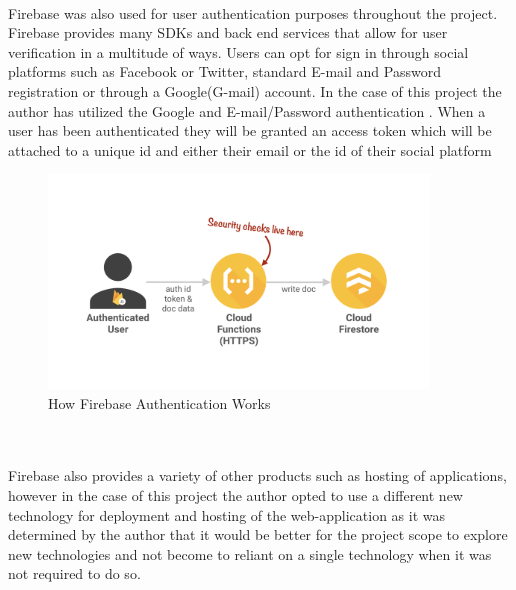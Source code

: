 \paragraph{}
Firebase was also used for user authentication purposes throughout the project. Firebase provides many SDKs and back end services that allow for user verification in a multitude of ways. Users can opt for sign in through social platforms such as Facebook or Twitter, standard E-mail and Password registration or through a Google(G-mail) account. In the case of this project the author has utilized the Google and E-mail/Password authentication \cite{fireauth}. When a user has been authenticated they will be granted an access token which will be attached to a unique id and either their email or the id of their social platform \\

\begin{figure}[h!]
    	\caption{How Firebase Authentication Works}
	\centering
	\includegraphics[width=0.9\textwidth]{images/fireauth.png}
\end{figure}
\\

\paragraph{}
Firebase also provides a variety of other products such as hosting of applications, however in the case of this project the author opted to use a different new technology for deployment and hosting of the web-application as it was determined by the author that it would be better for the project scope to explore new technologies and not become to reliant on a single technology when it was not required to do so. 

